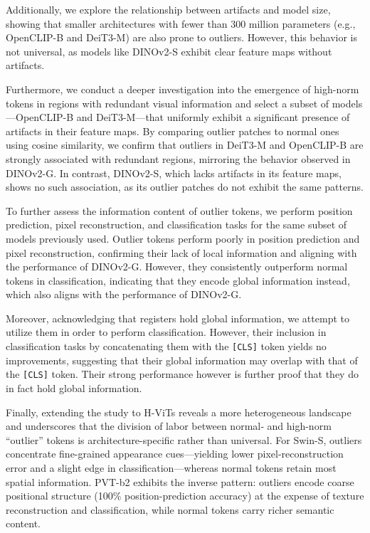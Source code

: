\documentclass[10pt]{article} %
\begin{document}
Additionally, we explore the relationship between artifacts and model size, showing that smaller architectures with fewer than 300 million parameters (e.g., OpenCLIP-B and DeiT3-M) are also prone to outliers. However, this behavior is not universal, as models like DINOv2-S exhibit clear feature maps without artifacts.

Furthermore, we conduct a deeper investigation into the emergence of high-norm tokens in regions with redundant visual information and select a subset of models—OpenCLIP-B and DeiT3-M—that uniformly exhibit a significant presence of artifacts in their feature maps. By comparing outlier patches to normal ones using cosine similarity, we confirm that outliers in DeiT3-M and OpenCLIP-B are strongly associated with redundant regions, mirroring the behavior observed in DINOv2-G. In contrast, DINOv2-S, which lacks artifacts in its feature maps, shows no such association, as its outlier patches do not exhibit the same patterns. 

To further assess the information content of outlier tokens, we perform position prediction, pixel reconstruction, and classification tasks for the same subset of models previously used. Outlier tokens perform poorly in position prediction and pixel reconstruction, confirming their lack of local information and aligning with the performance of DINOv2-G. However, they consistently outperform normal tokens in classification, indicating that they encode global information instead, which also aligns with the performance of DINOv2-G.

Moreover, acknowledging that registers hold global information, we attempt to utilize them in order to perform classification. However, their inclusion in classification tasks by concatenating them with the \texttt{[CLS]} token yields no improvements, suggesting that their global information may overlap with that of the \texttt{[CLS]} token. Their strong performance however is further proof that they do in fact hold global information.

Finally, extending the study to H-ViTs reveals a more heterogeneous landscape and underscores that the division of labor between normal‐ and high-norm “outlier” tokens is architecture-specific rather than universal.
For Swin-S, outliers concentrate fine-grained appearance cues—yielding lower pixel-reconstruction error and a slight edge in classification—whereas normal tokens retain most spatial information.
PVT-b2 exhibits the inverse pattern: outliers encode coarse positional structure (100\% position-prediction accuracy) at the expense of texture reconstruction and classification, while normal tokens carry richer semantic content.
\end{document}
